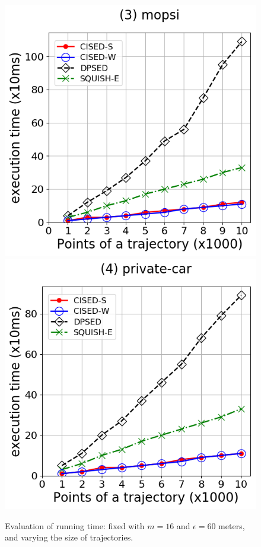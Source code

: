 {\begin{figure}[tb!]
\includegraphics[scale = 0.290]{Figures/Exp-time-size-mopsi.png}\hspace{1ex}
\includegraphics[scale = 0.290]{Figures/Exp-time-size-private.png}
\caption{\small Evaluation of running time: fixed with $m=16$ and $\epsilon=60$ meters, and varying the size of trajectories. }
\label{fig:time-size}
\vspace{-2ex}
\end{figure}







}
